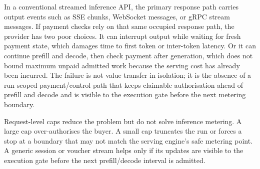 \documentclass[11pt]{article}
\begin{document}
In a conventional streamed inference API, the primary response path carries output events such as SSE chunks, WebSocket messages, or gRPC stream messages. If payment checks rely on that same occupied response path, the provider has two poor choices. It can interrupt output while waiting for fresh payment state, which damages time to first token or inter-token latency. Or it can continue prefill and decode, then check payment after generation, which does not bound maximum unpaid admitted work because the serving cost has already been incurred. The failure is not value transfer in isolation; it is the absence of a run-scoped payment/control path that keeps claimable authorisation ahead of prefill and decode and is visible to the execution gate before the next metering boundary.

Request-level caps reduce the problem but do not solve inference metering. A large cap over-authorises the buyer. A small cap truncates the run or forces a stop at a boundary that may not match the serving engine's safe metering point. A generic session or voucher stream helps only if its updates are visible to the execution gate before the next prefill/decode interval is admitted.
\end{document}
